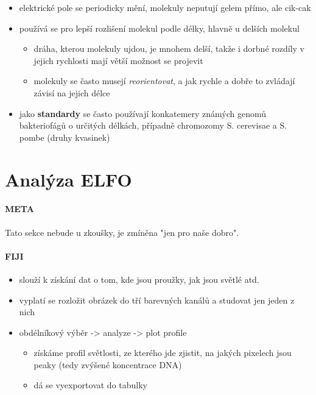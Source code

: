 \documentclass[DIV=8]{scrreprt}
\newcommand{\mybox}[2]{
    \paragraph{#1} #2
}
\begin{document}
\begin{itemize}[nosep]
    \item elektrické pole se periodicky mění, molekuly neputují gelem přímo, ale cik-cak
    \item používá se pro lepší rozlišení molekul podle délky, hlavně u delších molekul
\begin{itemize}[nosep]
    \item dráha, kterou molekuly ujdou, je mnohem delší, takže i dorbné rozdíly v jejich rychlosti mají větší možnost se projevit
    \item molekuly se často musejí \emph{reorientovat}, a jak rychle a dobře to zvládají závisí na jejich délce
\end{itemize}

    \item jako \textbf{standardy} se často používají konkatemery známých genomů bakteriofágů o určitých délkách, případně chromozomy S. cerevisae a S. pombe (druhy kvasinek)
\end{itemize}



\section{Analýza ELFO} \label{Analýza ELFO}


\mybox{META}{Tato sekce nebude u zkoušky, je zmíněna "jen pro naše dobro".}


\paragraph{FIJI}
\begin{itemize}[nosep]
    \item slouží k získání dat o tom, kde jsou proužky, jak jsou světlé atd.
    \item vyplatí se rozložit obrázek do tří barevných kanálů a studovat jen jeden z nich
    \item obdélníkový výběr -> analyze -> plot profile
\begin{itemize}[nosep]
    \item získáme profil světlosti, ze kterého jde zjistit, na jakých pixelech jsou peaky (tedy zvýšené koncentrace DNA)
    \item dá se vyexportovat do tabulky
\end{itemize}

\end{itemize}
\end{document}
